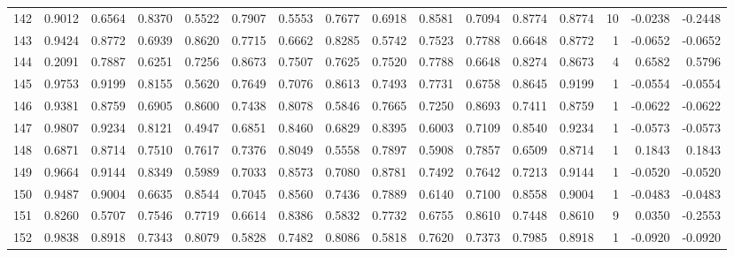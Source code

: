 \begin{tabular}{lrrrrrrrrrrrrrrr}
142 &      0.9012 &  0.6564 &  0.8370 &  0.5522 &  0.7907 &  0.5553 &  0.7677 &  0.6918 &  0.8581 &  0.7094 &   0.8774 &     0.8774 &     10 &                   -0.0238 &                    -0.2448 \\
143 &      0.9424 &  0.8772 &  0.6939 &  0.8620 &  0.7715 &  0.6662 &  0.8285 &  0.5742 &  0.7523 &  0.7788 &   0.6648 &     0.8772 &      1 &                   -0.0652 &                    -0.0652 \\
144 &      0.2091 &  0.7887 &  0.6251 &  0.7256 &  0.8673 &  0.7507 &  0.7625 &  0.7520 &  0.7788 &  0.6648 &   0.8274 &     0.8673 &      4 &                    0.6582 &                     0.5796 \\
145 &      0.9753 &  0.9199 &  0.8155 &  0.5620 &  0.7649 &  0.7076 &  0.8613 &  0.7493 &  0.7731 &  0.6758 &   0.8645 &     0.9199 &      1 &                   -0.0554 &                    -0.0554 \\
146 &      0.9381 &  0.8759 &  0.6905 &  0.8600 &  0.7438 &  0.8078 &  0.5846 &  0.7665 &  0.7250 &  0.8693 &   0.7411 &     0.8759 &      1 &                   -0.0622 &                    -0.0622 \\
147 &      0.9807 &  0.9234 &  0.8121 &  0.4947 &  0.6851 &  0.8460 &  0.6829 &  0.8395 &  0.6003 &  0.7109 &   0.8540 &     0.9234 &      1 &                   -0.0573 &                    -0.0573 \\
148 &      0.6871 &  0.8714 &  0.7510 &  0.7617 &  0.7376 &  0.8049 &  0.5558 &  0.7897 &  0.5908 &  0.7857 &   0.6509 &     0.8714 &      1 &                    0.1843 &                     0.1843 \\
149 &      0.9664 &  0.9144 &  0.8349 &  0.5989 &  0.7033 &  0.8573 &  0.7080 &  0.8781 &  0.7492 &  0.7642 &   0.7213 &     0.9144 &      1 &                   -0.0520 &                    -0.0520 \\
150 &      0.9487 &  0.9004 &  0.6635 &  0.8544 &  0.7045 &  0.8560 &  0.7436 &  0.7889 &  0.6140 &  0.7100 &   0.8558 &     0.9004 &      1 &                   -0.0483 &                    -0.0483 \\
151 &      0.8260 &  0.5707 &  0.7546 &  0.7719 &  0.6614 &  0.8386 &  0.5832 &  0.7732 &  0.6755 &  0.8610 &   0.7448 &     0.8610 &      9 &                    0.0350 &                    -0.2553 \\
152 &      0.9838 &  0.8918 &  0.7343 &  0.8079 &  0.5828 &  0.7482 &  0.8086 &  0.5818 &  0.7620 &  0.7373 &   0.7985 &     0.8918 &      1 &                   -0.0920 &                    -0.0920 \\

\end{tabular}
